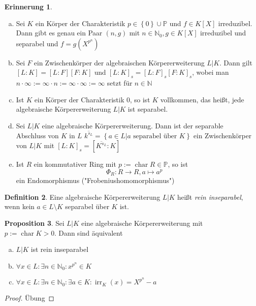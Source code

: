 \documentclass[
twoside=semi,
fontsize=12,
DIV=12, 
cleardoublepage=current,
leqno,
headings=optiontoheadandtoc, 
toc=idx
]{scrbook}
\newcommand{\N}{\mathbb{N}}
\renewcommand{\P}{\mathbb{P}}
\newcommand{\set}[1]{\left\{ #1 \right\}}
\DeclareMathOperator{\irr}{irr}
\DeclareMathOperator{\Char}{char}
\theoremstyle{definition}
\newtheorem{definition}{Definition}[section]
\newtheorem{proposition}[definition]{Proposition}
\newtheorem{erinnerung}[definition]{Erinnerung}
\begin{document}
	\begin{erinnerung}\label{2.4.7}\hfill
		\begin{enumerate}[(a)]
			\item Sei $K$ ein K\"orper der Charakteristik $p \in \set{0} \cup \P$ und $f \in K[X]$ irreduzibel. Dann gibt es genau ein Paar $(n,g)$ mit $n \in \N_0, g \in K[X]$ irreduzibel und separabel und $f = g(X^{p^n})$
			
			\item Sei $F$ ein Zwischenk\"orper der algebraischen K\"orpererweiterung $L|K$. Dann gilt $[L:K]=[L:F][F:K]$ und 
			$[L:K]_s = [L:F]_s[F:K]_s$, wobei man \linebreak $n\cdot \infty := \infty \cdot n := \infty \cdot \infty := \infty$ setzt f\"ur $n \in \N$
			
			\item Ist $K$ ein K\"orper der Charakteristik $0$, so ist $K$ vollkommen, das hei\ss t, jede algebraische K\"orpererweiterung $L|K$ ist separabel.
			
			\item Sei $L|K$ eine algebraische K\"orpererweiterung. Dann ist der separable Abschluss von $K$ in $L$ $\overline{k^{s_L}} = \set{a \in L| a \textrm{ separabel \"uber } K}$ ein
			Zwischenk\"orper von $L|K$ mit \linebreak $[L:K]_s = [\overline{K^{s_L}}:K]$
			
			\item Ist $R$ ein kommutativer Ring mit $p:= \Char R \in \P$, so ist 
				\[\Phi_R: R  \to R, a \mapsto a^p\]
			ein Endomorphismus ("Frobeniushomomorphismus")
		\end{enumerate}
	\end{erinnerung}

	\begin{definition}\label{2.4.8}\hfill\newline
		Eine algebraische K\"orpererweiterung $L|K$ hei\ss t \emph{rein inseparabel}, wenn kein $a \in L \setminus K$ separabel \"uber $K$ ist.
	\end{definition}

	\begin{proposition}\label{2.4.9}\hfill\newline
		Sei $L|K$ eine algebraische K\"orpererweiterung mit $p:= \Char K > 0$. Dann sind \"aquivalent
		\begin{enumerate}[(a)]
			\item $L|K$ ist rein inseparabel
			\item $\forall x \in L: \exists n \in \N_0: x^{p^n} \in K$
			\item $\forall x \in L: \exists n \in \N_0: \exists a \in K: \irr_K(x) = X^{p^n} - a$
		\end{enumerate}
	
		\begin{proof}
			\"Ubung
		\end{proof}
	\end{proposition}
\end{document}
